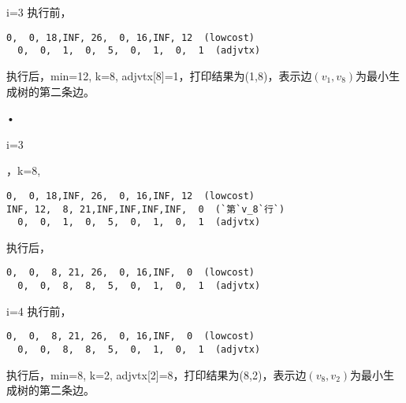 \begin{frame}[fragile]\ft{\subsubsecname}
\tf i=3  
执行前，
\begin{lstlisting}[xleftmargin=2em]
  0,  0, 18,INF, 26,  0, 16,INF, 12  (lowcost)
  0,  0,  1,  0,  5,  0,  1,  0,  1  (adjvtx)
\end{lstlisting} %
执行后，min=12, k=8, adjvtx[8]=1，打印结果为(1,8)，表示边$(v_1,v_8)$为最小生成树的第二条边。
\end{frame}


\begin{frame}\ft{\subsubsecname}
\begin{figure}

\end{figure}•
\end{frame}


\begin{frame}[fragile]\ft{\subsubsecname}
\tf i=3 

，k=8,  
\begin{lstlisting}[xleftmargin=2em]
  0,  0, 18,INF, 26,  0, 16,INF, 12  (lowcost)
INF, 12,  8, 21,INF,INF,INF,INF,  0  (`第`v_8`行`)
  0,  0,  1,  0,  5,  0,  1,  0,  1  (adjvtx)
\end{lstlisting}  
执行后，
\begin{lstlisting}[xleftmargin=2em]
  0,  0,  8, 21, 26,  0, 16,INF,  0  (lowcost)
  0,  0,  8,  8,  5,  0,  1,  0,  1  (adjvtx)
\end{lstlisting}
\end{frame}


\begin{frame}[fragile]\ft{\subsubsecname}
\tf i=4 
执行前，
\begin{lstlisting}[xleftmargin=2em]
  0,  0,  8, 21, 26,  0, 16,INF,  0  (lowcost)
  0,  0,  8,  8,  5,  0,  1,  0,  1  (adjvtx)
\end{lstlisting} %
执行后，min=8, k=2, adjvtx[2]=8，打印结果为(8,2)，表示边$(v_8,v_2)$为最小生成树的第二条边。
\end{frame}


